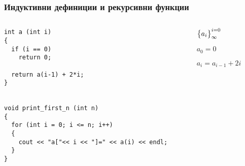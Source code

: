\documentclass{beamer}
\begin{document}
\begin{frame}[fragile]
\frametitle{Индуктивни дефиниции и рекурсивни функции}


\begin{columns}[t]
  \begin{column}{0.7\textwidth}

\begin{lstlisting}
int a (int i)
{
  if (i == 0)
    return 0;

  return a(i-1) + 2*i;
}


void print_first_n (int n)
{
  for (int i = 0; i <= n; i++)
  {
    cout << "a["<< i << "]=" << a(i) << endl;
  }
}
\end{lstlisting}


  \end{column}
  \begin{column}{0.3\textwidth}
\begin{flushleft}

  $\big{\{}a_i\big{\}}_\infty^{i=0}$

  \vspace{10px}

  $a_0 = 0$

  $a_i = a_{i-1} + 2i$



\end{flushleft}
  \end{column}
\end{columns}

\end{frame}
\end{document}
